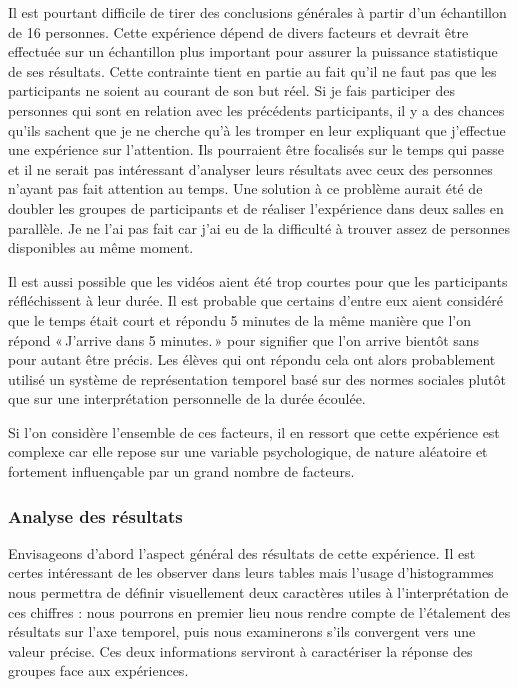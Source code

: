 \documentclass[12pt,fleqn,oneside,french,openany]{book} %
\begin{document}
Il est pourtant difficile de tirer des conclusions générales à partir d'un échantillon de 16 personnes. Cette expérience dépend de divers facteurs et devrait être effectuée sur un échantillon plus important pour assurer la puissance statistique de ses résultats. Cette contrainte tient en partie au fait qu'il ne faut pas que les participants ne soient au courant de son but réel. Si je fais participer des personnes qui sont en relation avec les précédents participants, il y a des chances qu'ils sachent que je ne cherche qu'à les tromper en leur expliquant que j'effectue une expérience sur l'attention. Ils pourraient être focalisés sur le temps qui passe et il ne serait pas intéressant d'analyser leurs résultats avec ceux des personnes n'ayant pas fait attention au temps. Une solution à ce problème aurait été de doubler les groupes de participants et de réaliser l'expérience dans deux salles en parallèle. Je ne l'ai pas fait car j'ai eu de la difficulté à trouver assez de personnes disponibles au même moment. 

Il est aussi possible que les vidéos aient été trop courtes pour que les participants réfléchissent à leur durée. Il est probable que certains d'entre eux aient considéré que le temps était court et répondu 5 minutes de la même manière que l'on répond «\,J'arrive dans 5 minutes.\,» pour signifier que l'on arrive bientôt sans pour autant être précis. Les élèves qui ont répondu cela ont alors probablement utilisé un système de représentation temporel basé sur des normes sociales plutôt que sur une interprétation personnelle de la durée écoulée.

Si l'on considère l'ensemble de ces facteurs, il en ressort que cette expérience est complexe car elle repose sur une variable psychologique, de nature aléatoire et fortement influençable par un grand nombre de facteurs.



\subsubsection{Analyse des résultats} \label{sssec:analyseResult1.1}
Envisageons d'abord l'aspect général des résultats de cette expérience. Il est certes intéressant de les observer dans leurs tables mais l'usage d'histogrammes nous permettra de définir visuellement deux caractères utiles à l'interprétation de ces chiffres : nous pourrons en premier lieu nous rendre compte de l'étalement des résultats sur l'axe temporel, puis nous examinerons s'ils convergent vers une valeur précise. Ces deux informations serviront à caractériser la réponse des groupes face aux expériences.
\end{document}
